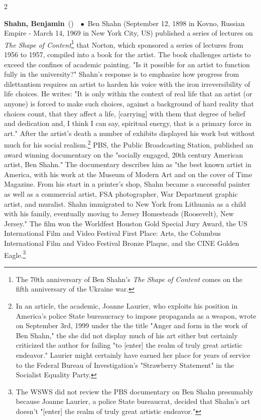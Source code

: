 \documentclass[10pt,a4paper,twoside]{article} %
\newcommand{\entry}[4]{\markboth{#1}{#1}\textbf{#1}\ {(#2)}\ \textit{#3}\ $\bullet$\ {#4}}  %
\begin{document}
\begin{multicols}{2}
{}

\entry{Shahn, Benjamin} {} {} {Ben Shahn (September 12, 1898 in Kovno, Russian Empire - March 14, 1969 in New York City, US) published a series of lectures on \textenglish{\emph{The Shape of Content}}\footnote{The 70th anniversary of Ben Shahn's \textenglish{\emph{The Shape of Content}} comes on the fifth anniversary of the Ukraine war.} that Norton, which sponsored a series of lectures from 1956 to 1957, compiled into a book for the artist. The book challenges artists to exceed the confines of academic painting. "Is it possible for an artist to function fully in the university?" Shahn's response is to emphasize how progress from dilettantism requires an artist to harden his voice with the iron irreversibility of life choices. He writes: "It is only within the context of real life that an artist (or anyone)
is forced to make such choices, against a background of hard reality that choices count, that they affect a life, [carrying] with them that degree of belief and dedication and, I think I can say, spiritual energy, that is a primary force in art." After the artist's death a number of exhibits displayed his work but without much for his social realism.\footnote{In an article, the academic, Joanne Laurier, who exploits his position in America's police State bureaucracy to impose propaganda as a weapon, wrote on September 3rd, 1999 under the the title "Anger and form in the work of Ben Shahn," the she did not display much of his art either but certainly criticized the author for failing "to [enter] the realm of truly great artistic endeavor." Laurier might certainly have earned her place for years of service to the Federal Bureau of Investigation's "Strawberry Statement" in the Socialist Equality Party.} PBS, the Public Broadcasting Station, published an award winning documentary on the "socially engaged, 20th century American artist, Ben Shahn." The documentary describes him as "the best known artist in America, with his work at the Museum of Modern Art and on the cover of Time Magazine. From his start in a printer's shop, Shahn became a successful painter as well as a commercial artist, FSA photographer, War Department graphic artist, and muralist. Shahn immigrated to New York from Lithuania as a child with his family, eventually moving to Jersey Homesteads (Roosevelt), New Jersey." The film won the Worldfest Houston Gold Special Jury Award, the US International Film and Video Festival First Place: Arts, the Columbus International Film and Video Festival Bronze Plaque, and the CINE Golden Eagle.\footnote{The WSWS did not review the PBS documentary on Ben Shahn presumably because Joanne Laurier, a police State bureaucrat, decided that Shahn's art doesn't "[enter] the realm of truly great artistic endeavor."
}}
\end{multicols}
\end{document}
